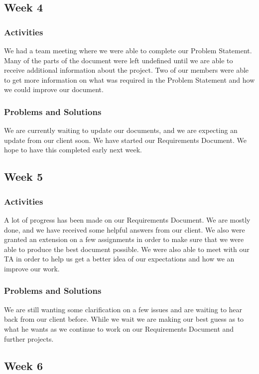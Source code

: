 \documentclass[journal,10pt,onecolumn,compsoc]{IEEEtran} \usepackage[margin=1.0in]{geometry} \usepackage{pdfpages}
\begin{document}
\subsection{Week 4}
    \subsubsection{Activities}
    We had a team meeting where we were able to complete our Problem Statement. Many of the parts of the document were left undefined until we are able to receive additional information about the project. Two of our members were able to get more information on what was required in the Problem Statement and how we could improve our document.
    \subsubsection{Problems and Solutions}
    We are currently waiting to update our documents, and we are expecting an update from our client soon. We have started our Requirements Document. We hope to have this completed early next week.
    
\subsection{Week 5}
    \subsubsection{Activities}
    A lot of progress has been made on our Requirements Document. We are mostly done, and we have received some helpful answers from our client. We also were granted an extension on a few assignments in order to make sure that we were able to produce the best document possible. We were also able to meet with our TA in order to help us get a better idea of our expectations and how we an improve our work.
    \subsubsection{Problems and Solutions}
    We are still wanting some clarification on a few issues and are waiting to hear back from our client before. While we wait we are making our best guess as to what he wants as we continue to work on our Requirements Document and further projects.
    
\subsection{Week 6}
\end{document}
